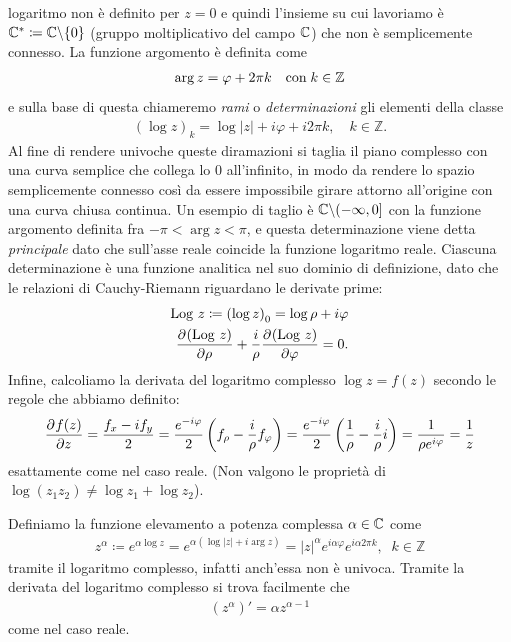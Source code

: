 logaritmo non è definito per $ z = 0 $ e quindi l'insieme su cui lavoriamo è $ \mathbb{C}^* \coloneq \mathbb{C} \backslash \{0\} $ (gruppo moltiplicativo del campo $ \mathbb{C} $) che 
non è semplicemente connesso. 
La funzione argomento è definita come 
\begin{align}
  \arg z = \varphi + 2\pi k \quad \textnormal{con} \; k \in \mathbb{Z}
\end{align}
e sulla base di questa chiameremo \textit{rami} o \textit{determinazioni} gli elementi della classe
\begin{align}
  \left( \log z \right)_k = \log |z| + i \varphi + i2\pi k, \quad k \in \mathbb{Z}.
\end{align}
Al fine di rendere univoche queste diramazioni si taglia il piano complesso con una curva semplice che collega lo $ 0 $ all'infinito, in modo da rendere 
lo spazio semplicemente connesso così da essere impossibile girare attorno all'origine con una curva chiusa continua.
Un esempio di taglio è $ \mathbb{C} \backslash (-\infty, 0] $ con la funzione argomento definita fra $ -\pi < \arg z < \pi $, e questa determinazione viene detta 
\textit{principale} dato che sull'asse reale coincide la funzione logaritmo reale. Ciascuna determinazione è una funzione analitica nel suo 
dominio di definizione, dato che le relazioni di Cauchy-Riemann riguardano le derivate prime:
\begin{align}
  \Log z \coloneq \left( \log z \right)_0 = \log \rho + i \varphi
  \\
  \der{(\Log z)}{\rho} + \frac{i}\rho \der{(\Log z)}{\varphi} = 0.
\end{align}
Infine, calcoliamo la derivata del logaritmo complesso $ \log z = f(z) $ secondo le regole che abbiamo definito:
\begin{align}
  \der{f(z)}{z} = \frac{f_x - i f_y}2 = \frac{e^{-i\varphi}}{2} \left( f_\rho -\frac{i}\rho f_\varphi \right) 
  = \frac{e^{-i\varphi}}{2} \left( \frac1\rho - \frac{i}\rho i \right) = \frac1{\rho e^{i\varphi}} = \frac1z
\end{align}
esattamente come nel caso reale. (Non valgono le proprietà di $ \log(z_1 z_2) \neq \log z_1 + \log z_2 $).

Definiamo la funzione elevamento a potenza complessa $ \alpha \in \mathbb{C} $ come 
\begin{align}
  z^\alpha \coloneq e^{\alpha \log z} = e^{\alpha \left( \log |z| + i\arg z \right)} = |z|^\alpha e^{i\alpha \varphi} e^{i\alpha 2\pi k},  
  \;\; k \in \mathbb{Z}
\end{align}
tramite il logaritmo complesso, infatti anch'essa non è univoca. Tramite la derivata del logaritmo complesso si trova facilmente che 
\begin{align}
  \left( z^\alpha \right)' = \alpha z^{\alpha -1}
\end{align}
come nel caso reale.


